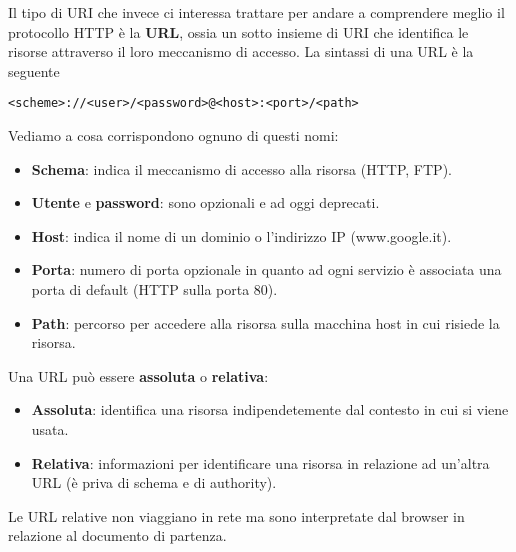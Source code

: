 Il tipo di URI che invece ci interessa trattare per andare a 
comprendere meglio il protocollo HTTP è la \textbf{URL}, ossia un sotto
insieme di URI che identifica le risorse attraverso il loro meccanismo 
di accesso. La sintassi di una URL è la seguente
\begin{center}
	\verb|<scheme>://<user>/<password>@<host>:<port>/<path>| 
\end{center}
Vediamo a cosa corrispondono ognuno di questi nomi:
\begin{itemize}
	\item \textbf{Schema}: indica il meccanismo di accesso alla risorsa
		(HTTP, FTP).
	\item \textbf{Utente} e \textbf{password}: sono opzionali e ad 
		oggi deprecati.
	\item \textbf{Host}: indica il nome di un dominio o l'indirizzo IP 
		(www.google.it).
	\item \textbf{Porta}: numero di porta opzionale in quanto ad ogni 
		servizio è associata una porta di default (HTTP sulla porta 
		80).
	\item \textbf{Path}: percorso per accedere alla risorsa sulla 
		macchina host in cui risiede la risorsa.
\end{itemize}
Una URL può essere \textbf{assoluta} o \textbf{relativa}:
\begin{itemize}
	\item \textbf{Assoluta}: identifica una risorsa indipendetemente 
		dal contesto in cui si viene usata.
	\item \textbf{Relativa}: informazioni per identificare una risorsa
		in relazione ad un'altra URL (è priva di schema e di 
		authority).
\end{itemize}
Le URL relative non viaggiano in rete ma sono interpretate dal browser 
in relazione al documento di partenza.
